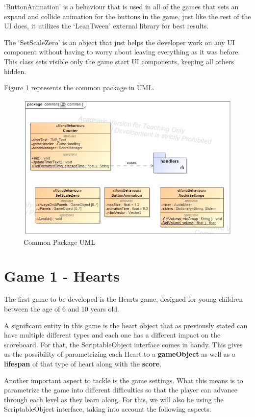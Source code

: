 `ButtonAnimation' is a behaviour that is used in all of the games that sets an expand and collide animation for the buttons in the game, just like the rest of the UI does, it utilizes the `LeanTween' external library for best results.

The `SetScaleZero' is an object that just helps the developer work on any UI component without having to worry about leaving everything as it was before. This class sets visible only the game start UI components, keeping all others hidden.

Figure \ref{fig:common-classes} represents the common package in UML.
\begin{figure}[H]
    \centering
    \includegraphics[width=0.6\linewidth]{Chapters/new_architechture/class__common__Common.jpg}
    \caption{Common Package UML}
    \label{fig:common-classes}
\end{figure}

\newpage
\section{Game 1 - Hearts}

The first game to be developed is the Hearts game, designed for young children between the age of 6 and 10 years old.

A significant entity in this game is the heart object that as previously stated can have multiple different types and each one has a different impact on the scoreboard. For that, the ScriptableObject interface \cite{unityDocScriptableObj} comes in handy. This gives us the possibility of parametrizing each Heart to a \textbf{gameObject} as well as a \textbf{lifespan} of that type of heart along with the \textbf{score}.

Another important aspect to tackle is the game settings. What this means is to parametrize the game into different difficulties so that the player can advance through each level as they learn along.
For this, we will also be using the ScriptableObject interface, taking into account the following aspects:

